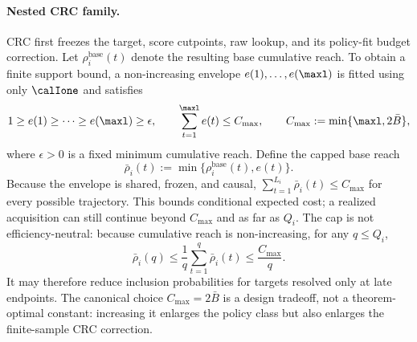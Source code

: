 \paragraph{Nested CRC family.}
CRC first freezes the target, score cutpoints, raw lookup, and its policy-fit
budget correction.  Let $\rho_i^{\mathrm{base}}(t)$ denote the resulting
base cumulative reach.  To obtain a finite support bound, a non-increasing
envelope $e(1),\ldots,e(\maxl)$ is fitted using only $\calIone$ and satisfies
\begin{equation}
    1\geq e(1)\geq\cdots\geq e(\maxl)\geq\epsilon,
    \qquad
    \sum_{t=1}^{\maxl}e(t)\leq C_{\max},
    \qquad
    C_{\max}:=\min\{\maxl,2\bar B\},
    \label{eq:dapro_main_pathwise_cap}
\end{equation}
where $\epsilon>0$ is a fixed minimum cumulative reach.  Define the capped
base reach
\begin{equation}
    \bar\rho_i(t):=\min\{\rho_i^{\mathrm{base}}(t),e(t)\}.
    \label{eq:dapro_main_capped_reach}
\end{equation}
Because the envelope is shared, frozen, and causal,
$\sum_{t=1}^{L_i}\bar\rho_i(t)\leq C_{\max}$ for every possible trajectory.
This bounds conditional expected cost; a realized acquisition can still
continue beyond $C_{\max}$ and as far as $Q_i$.  The cap is not
efficiency-neutral: because cumulative reach is non-increasing, for any
$q\leq Q_i$,
\begin{equation}
    \bar\rho_i(q)
      \leq\frac{1}{q}\sum_{t=1}^{q}\bar\rho_i(t)
      \leq\frac{C_{\max}}{q}.
    \label{eq:dapro_main_cap_terminal_effect}
\end{equation}
It may therefore reduce inclusion probabilities for targets resolved only at
late endpoints.  The canonical choice $C_{\max}=2\bar B$ is a design tradeoff,
not a theorem-optimal constant: increasing it enlarges the policy class but
also enlarges the finite-sample CRC correction.


